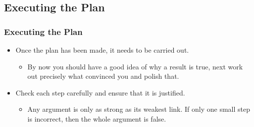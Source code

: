 \documentclass{beamer}
\begin{document}

\subsection{Executing the Plan}

\begin{frame}%
\frametitle{Executing the Plan}

\begin{itemize}

\item Once the plan has been made, it needs to be carried out.
\begin{itemize}
\item<1-> By now you should have a good
idea of why a result is true, next work out precisely what convinced you and polish that.
\end{itemize}

\vspace{0.5cm}

\item<2-> Check each step carefully and ensure that it is justified.
\begin{itemize}
\item<2-> Any argument is only as strong as
its weakest link. If only one small step is incorrect, then the whole argument is false.
\end{itemize}

\end{itemize}

\end{frame}
\end{document}
